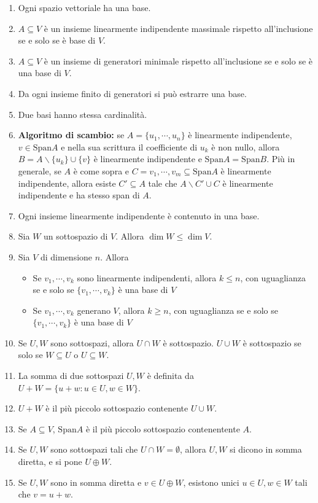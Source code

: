 \documentclass[a4paper,11pt]{article}
\newcommand{\Span}{\mathrm{Span}}					%
\begin{document}
\begin{enumerate}[resume]
	\item Ogni spazio vettoriale ha una base.
	\item $A\subseteq V$ è un insieme linearmente indipendente massimale rispetto all'inclusione se e solo se è base di $V$.
	\item $A\subseteq V$ è un insieme di generatori minimale rispetto all'inclusione se e solo se è una base di $V$.
	\item Da ogni insieme finito di generatori si può estrarre una base.
	\item Due basi hanno stessa cardinalità.
	\item \textbf{Algoritmo di scambio:} se $A=\{u_1,\cdots,u_n\}$ è linearmente indipendente, $v\in\Span A$ e nella sua scrittura il coefficiente di $u_k$ è non nullo, allora $B=A\backslash\{u_k\}\cup\{v\}$ è linearmente indipendente e $\Span A=\Span B$. Più in generale, se $A$ è come sopra e $C={v_1,\cdots, v_m}\subseteq\Span A$ è linearmente indipendente, allora esiste $C'\subseteq A$ tale che $A\backslash C'\cup C$ è linearmente indipendente e ha stesso span di $A$.
	\item Ogni insieme linearmente indipendente è contenuto in una base.
	\item Sia $W$ un sottospazio di $V$. Allora $\dim W\leq \dim V$.
	\item Sia $V$ di dimensione $n$. Allora
	\begin{itemize}
		\item Se $v_1,\cdots,v_k$ sono linearmente indipendenti, allora $k\leq n$, con uguaglianza se e solo se $\{v_1,\cdots,v_k\}$ è una base di $V$
		\item Se $v_1,\cdots,v_k$ generano $V$, allora $k\geq n$, con uguaglianza se e solo se $\{v_1,\cdots,v_k\}$ è una base di $V$
	\end{itemize}
	\item Se $U,W$ sono sottospazi, allora $U\cap W$ è sottospazio. $U\cup W$ è sottospazio se solo se $W\subseteq U$ o $U\subseteq W$.
	\item La somma di due sottospazi $U,W$ è definita da $U+W=\{u+w:u\in U,w\in W\}$.
	\item $U+W$ è il più piccolo sottospazio contenente $U\cup W$.
	\item Se $A\subseteq V$, $\Span A$ è il più piccolo sottospazio contenentente $A$.
	\item Se $U,W$ sono sottospazi tali che $U\cap W=\emptyset$, allora $U,W$ si dicono in somma diretta, e si pone $U\oplus W$.
	\item Se $U,W$ sono in somma diretta e $v\in U\oplus W$, esistono unici $u\in U,w\in W$ tali che $v=u+w$.

\end{enumerate}
\end{document}
